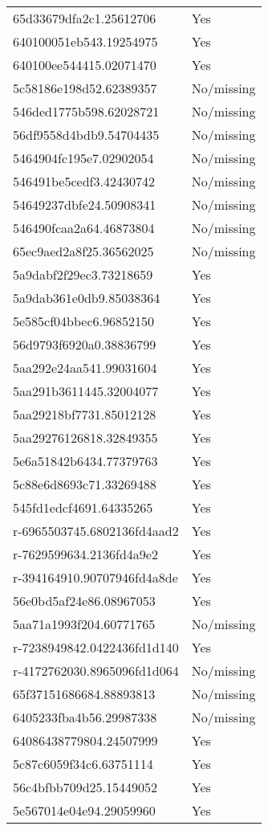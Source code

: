 \begin{tabular}{ll}
65d33679dfa2c1.25612706 & Yes \\
640100051eb543.19254975 & Yes \\
640100ee544415.02071470 & Yes \\
5c58186e198d52.62389357 & No/missing \\
546ded1775b598.62028721 & No/missing \\
56df9558d4bdb9.54704435 & No/missing \\
5464904fc195e7.02902054 & No/missing \\
546491be5cedf3.42430742 & No/missing \\
54649237dbfe24.50908341 & No/missing \\
546490fcaa2a64.46873804 & No/missing \\
65ec9aed2a8f25.36562025 & No/missing \\
5a9dabf2f29ec3.73218659 & Yes \\
5a9dab361e0db9.85038364 & Yes \\
5e585cf04bbec6.96852150 & Yes \\
56d9793f6920a0.38836799 & Yes \\
5aa292e24aa541.99031604 & Yes \\
5aa291b3611445.32004077 & Yes \\
5aa29218bf7731.85012128 & Yes \\
5aa29276126818.32849355 & Yes \\
5e6a51842b6434.77379763 & Yes \\
5c88e6d8693c71.33269488 & Yes \\
545fd1edcf4691.64335265 & Yes \\
r-6965503745.6802136fd4aad2 & Yes \\
r-7629599634.2136fd4a9e2 & Yes \\
r-394164910.90707946fd4a8de & Yes \\
56e0bd5af24e86.08967053 & Yes \\
5aa71a1993f204.60771765 & No/missing \\
r-7238949842.0422436fd1d140 & Yes \\
r-4172762030.8965096fd1d064 & No/missing \\
65f37151686684.88893813 & No/missing \\
6405233fba4b56.29987338 & No/missing \\
64086438779804.24507999 & Yes \\
5c87c6059f34c6.63751114 & Yes \\
56c4bfbb709d25.15449052 & Yes \\
5e567014e04e94.29059960 & Yes \\

\end{tabular}
